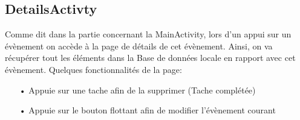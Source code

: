 \documentclass[12pt,a4paper]{report}
\begin{document}
\subsection{DetailsActivty}
\begin{flushleft}
\justify
Comme dit dans la partie concernant la MainActivity, lors d'un appui sur un évènement on accède à la page de détails de cet évènement. Ainsi, on va récupérer tout les éléments dans la Base de données locale en rapport avec cet évènement.
Quelques fonctionnalités de la page:
\begin{itemize}
\item[•] Appuie sur une tache afin de la supprimer (Tache complétée)
\item[•] Appuie sur le bouton flottant afin de modifier l'évènement courant
\end{itemize}
\begin{figure}[!h]
    \centering
    \begin{subfigure}[b]{0.3\textwidth}

\end{subfigure}
\end{figure}
\end{flushleft}
\end{document}
